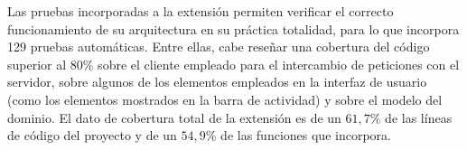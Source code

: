 Las pruebas incorporadas a la extensión permiten verificar el correcto funcionamiento de su arquitectura en su práctica totalidad, para lo que incorpora 129 pruebas automáticas. Entre ellas, cabe reseñar una cobertura del código superior al $80\%$ sobre el cliente empleado para el intercambio de peticiones con el servidor, sobre algunos de los elementos empleados en la interfaz de usuario (como los elementos mostrados en la barra de actividad) y sobre el modelo del dominio. El dato de cobertura total de la extensión es de un $61,7\%$ de las líneas de código del proyecto y de un $54,9\%$ de las funciones que incorpora.
